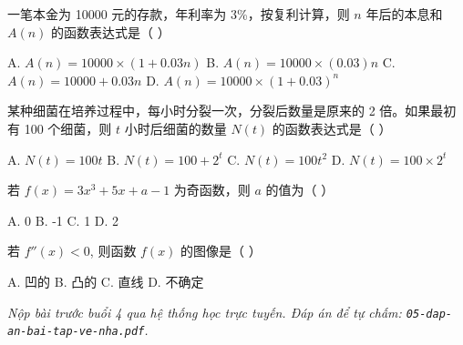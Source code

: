 \documentclass[11pt, a4paper]{article}
\begin{document}
\begin{baitap}[12]
一笔本金为 10000 元的存款，年利率为 3\%，按复利计算，则 $n$ 年后的本息和 $A(n)$ 的函数表达式是（ ）
\par\vspace{3pt}
\noindent A. $A(n) = 10000 \times (1 + 0.03n)$ \quad B. $A(n) = 10000 \times (0.03)n$ \quad C. $A(n) = 10000 + 0.03n$ \quad D. $A(n) = 10000 \times (1 + 0.03)^n$
\end{baitap}

\begin{baitap}[13]
某种细菌在培养过程中，每小时分裂一次，分裂后数量是原来的 2 倍。如果最初有 100 个细菌，则 $t$ 小时后细菌的数量 $N(t)$ 的函数表达式是（ ）
\par\vspace{3pt}
\noindent A. $N(t) = 100t$ \quad B. $N(t) = 100 + 2^t$ \quad C. $N(t) = 100t^2$ \quad D. $N(t) = 100 \times 2^t$
\end{baitap}

\begin{baitap}[14]
若 $f(x) = 3x^3 + 5x + a - 1$ 为奇函数，则 $a$ 的值为（ ）
\par\vspace{3pt}
\noindent A. 0 \quad B. -1 \quad C. 1 \quad D. 2
\end{baitap}

\begin{baitap}[15]
若 $f''(x) < 0$, 则函数 $f(x)$ 的图像是（ ）
\par\vspace{3pt}
\noindent A. 凹的 \quad B. 凸的 \quad C. 直线 \quad D. 不确定
\end{baitap}

\vspace{0.3cm}
\noindent\emph{Nộp bài trước buổi 4 qua hệ thống học trực tuyến. Đáp án để tự chấm: \texttt{05-dap-an-bai-tap-ve-nha.pdf}.}
\end{document}

